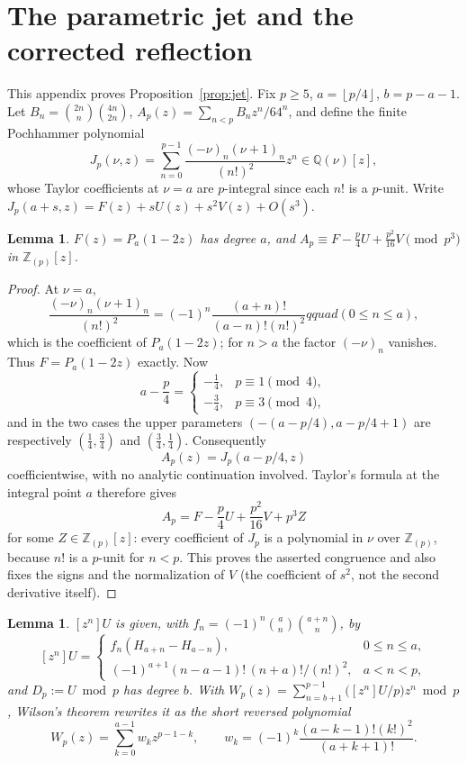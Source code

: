 \documentclass[11pt]{amsart}
\newtheorem{lemma}[theorem]{Lemma}
\theoremstyle{definition}
\theoremstyle{remark}
\newcommand{\Q}{\mathbb{Q}}
\newcommand{\Zp}{\mathbb{Z}_{(p)}}
\newcommand{\fl}[1]{\left\lfloor #1 \right\rfloor}
\begin{document}
\section{The parametric jet and the corrected reflection}\label{app:B}

This appendix proves Proposition~\ref{prop:jet}. Fix $p\ge5$,
$a=\fl{p/4}$, $b=p-a-1$. Let $B_n=\binom{2n}{n}\binom{4n}{2n}$,
$A_p(z)=\sum_{n<p}B_nz^n/64^n$, and define the finite Pochhammer
polynomial
\[
J_p(\nu,z)=\sum_{n=0}^{p-1}\frac{(-\nu)_n(\nu+1)_n}{(n!)^2}z^n
\in\Q(\nu)[z],
\]
whose Taylor coefficients at $\nu=a$ are $p$-integral since each $n!$ is
a $p$-unit. Write
$J_p(a+s,z)=F(z)+sU(z)+s^2V(z)+O(s^3)$.

\begin{lemma}\label{lem:B1}
$F(z)=P_a(1-2z)$ has degree $a$, and
$A_p\equiv F-\frac p4U+\frac{p^2}{16}V\pmod{p^3}$ in $\Zp[z]$.
\end{lemma}

\begin{proof}
At $\nu=a$,
\[
 \frac{(-\nu)_n(\nu+1)_n}{(n!)^2}
 =(-1)^n\frac{(a+n)!}{(a-n)!(n!)^2}qquad(0\le n\le a),
\]
which is the coefficient of $P_a(1-2z)$; for $n>a$ the factor
$(-\nu)_n$ vanishes.  Thus $F=P_a(1-2z)$ exactly.  Now
\[
 a-\frac p4=
 \begin{cases}-\frac14,&p\equiv1\pmod4,\\
 -\frac34,&p\equiv3\pmod4,
 \end{cases}
\]
and in the two cases the upper parameters
$(-(a-p/4),a-p/4+1)$ are respectively
$(\frac14,\frac34)$ and $(\frac34,\frac14)$.  Consequently
\[
 A_p(z)=J_p(a-p/4,z)
\]
coefficientwise, with no analytic continuation involved.  Taylor's
formula at the integral point $a$ therefore gives
\[
 A_p=F-\frac p4U+\frac{p^2}{16}V+p^3Z
\]
for some $Z\in\Zp[z]$: every coefficient of $J_p$ is a polynomial in
$\nu$ over $\Zp$, because $n!$ is a $p$-unit for $n<p$.  This proves
the asserted congruence and also fixes the signs and the normalization
of $V$ (the coefficient of $s^2$, not the second derivative itself).
\end{proof}

\begin{lemma}\label{lem:B2}
$[z^n]U$ is given, with $f_n=(-1)^n\binom an\binom{a+n}{n}$, by
\[
[z^n]U=
\begin{cases}
f_n(H_{a+n}-H_{a-n}),&0\le n\le a,\\
(-1)^{a+1}(n-a-1)!\,(n+a)!/(n!)^2,&a<n<p,
\end{cases}
\]
and $D_p:=U\bmod p$ has degree $b$. With
$W_p(z)=\sum_{n=b+1}^{p-1}\bigl([z^n]U/p\bigr)z^n\bmod p$, Wilson's
theorem rewrites it as the short reversed polynomial
\[
W_p(z)=\sum_{k=0}^{a-1}w_kz^{p-1-k},
\qquad
w_k=(-1)^k\frac{(a-k-1)!(k!)^2}{(a+k+1)!}.
\]
\end{lemma}
\end{document}
